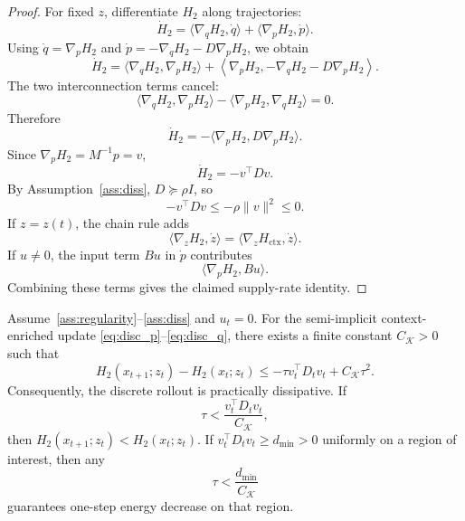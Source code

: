 \begin{proof}
For fixed \(z\), differentiate \(H_2\) along trajectories:
\[
    \dot H_2
    =
    \langle\nabla_qH_2,\dot q\rangle
    +
    \langle\nabla_pH_2,\dot p\rangle .
\]
Using \(\dot q=\nabla_pH_2\) and
\(\dot p=-\nabla_qH_2-D\nabla_pH_2\), we obtain
\[
    \dot H_2
    =
    \langle\nabla_qH_2,\nabla_pH_2\rangle
    +
    \left\langle
    \nabla_pH_2,
    -\nabla_qH_2-D\nabla_pH_2
    \right\rangle .
\]
The two interconnection terms cancel:
\[
    \langle\nabla_qH_2,\nabla_pH_2\rangle
    -
    \langle\nabla_pH_2,\nabla_qH_2\rangle=0.
\]
Therefore
\[
    \dot H_2
    =
    -\langle\nabla_pH_2,D\nabla_pH_2\rangle.
\]
Since \(\nabla_pH_2=M^{-1}p=v\),
\[
    \dot H_2=-v^\top Dv.
\]
By Assumption~\ref{ass:diss}, \(D\succeq \rho I\), so
\[
    -v^\top Dv\le -\rho\|v\|^2\le 0.
\]
If \(z=z(t)\), the chain rule adds
\[
    \langle\nabla_zH_2,\dot z\rangle
    =
    \langle\nabla_zH_{\mathrm{ctx}},\dot z\rangle .
\]
If \(u\neq 0\), the input term \(Bu\) in \(\dot p\) contributes
\[
    \langle\nabla_pH_2,Bu\rangle .
\]
Combining these terms gives the claimed supply-rate identity.
\end{proof}

\begin{theorem}
\label{thm:discrete_passivity}
Assume~\ref{ass:regularity}--\ref{ass:diss} and \(u_t=0\).
For the semi-implicit context-enriched update \eqref{eq:disc_p}--\eqref{eq:disc_q}, there
exists a finite constant \(C_{\mathcal K}>0\) such that
\[
    H_2(x_{t+1};z_t)-H_2(x_t;z_t)
    \le
    -\tau v_t^\top D_tv_t+C_{\mathcal K}\tau^2 .
\]
Consequently, the discrete rollout is practically dissipative. If
\[
    \tau < \frac{v_t^\top D_tv_t}{C_{\mathcal K}},
\]
then \(H_2(x_{t+1};z_t)<H_2(x_t;z_t)\). If
\(v_t^\top D_tv_t\ge d_{\min}>0\) uniformly on a region of interest, then any
\[
    \tau < \frac{d_{\min}}{C_{\mathcal K}}
\]
guarantees one-step energy decrease on that region.
\end{theorem}

